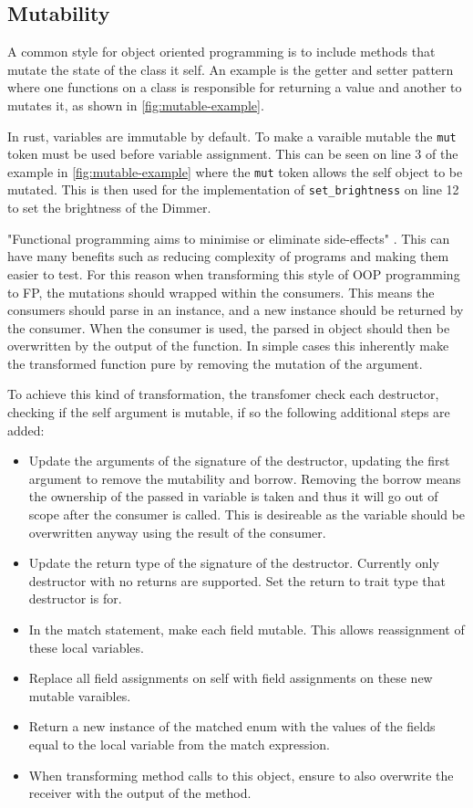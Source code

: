 \documentclass[ oneside,%
                    author={James Elgar},
                    degree={MEng},
                     title={Bidirectional transformer between functional and \\ object-oriented programming in Rust},
                  subtitle={}]{dissertation}
\newcommand{\rust}[1]{\texttt{#1}}
\begin{document}
\subsection{Mutability}

A common style for object oriented programming is to include methods that mutate the state of the class it self. An example is the getter and setter pattern where one functions on a class is responsible for returning a value and another to mutates it, as shown in \autoref{fig:mutable-example}.

In rust, variables are immutable by default. To make a varaible mutable the \rust{mut} token must be used before variable assignment. This can be seen on line 3 of the example in \autoref{fig:mutable-example} where the \verb|mut| token allows the self object to be mutated. This is then used for the implementation of \rust{set_brightness} on line 12 to set the brightness of the Dimmer. 

"Functional programming aims to minimise or eliminate side-effects" \cite{fp-uok}. This can have many benefits such as reducing complexity of programs and making them easier to test. For this reason when transforming this style of OOP programming to FP, the mutations should wrapped within the consumers. This means the consumers should parse in an instance, and a new instance should be returned by the consumer. When the consumer is used, the parsed in object should then be overwritten by the output of the function.  In simple cases this inherently make the transformed function pure by removing the mutation of the argument.

To achieve this kind of transformation, the transfomer check each destructor, checking if the self argument is mutable, if so the following additional steps are added:

\begin{itemize}
    \item Update the arguments of the signature of the destructor, updating the first argument to remove the mutability and borrow. Removing the borrow means the ownership of the passed in variable is taken and thus it will go out of scope after the consumer is called. This is desireable as the variable should be overwritten anyway using the result of the consumer. 
    \item Update the return type of the signature of the destructor. Currently only destructor with no returns are supported. Set the return to trait type that destructor is for.
    \item In the match statement, make each field mutable. This allows reassignment of these local variables.
    \item Replace all field assignments on self with field assignments on these new mutable varaibles. 
    \item Return a new instance of the matched enum with the values of the fields equal to the local variable from the match expression. 
    \item When transforming method calls to this object, ensure to also overwrite the receiver with the output of the method.
\end{itemize}
\end{document}
